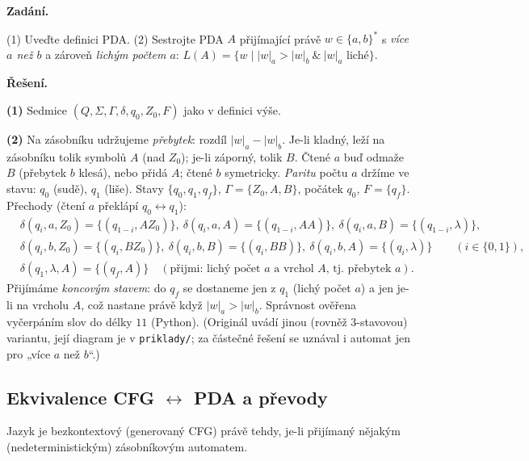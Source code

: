 \documentclass[11pt,a4paper]{article}
\begin{document}
\begin{priklad}
\par
\textbf{Zadání.}\par
(1) Uveďte definici PDA. (2) Sestrojte PDA $A$ přijímající právě $w\in\{a,b\}^*$ s \emph{více $a$ než $b$} a zároveň \emph{lichým počtem $a$}: $L(A)=\{w\mid |w|_a>|w|_b\ \&\ |w|_a$ liché$\}$.

\smallskip
\textbf{Řešení.}\par
\textbf{(1)} Sedmice $(Q,\Sigma,\Gamma,\delta,q_0,Z_0,F)$ jako v definici výše.

\textbf{(2)} Na zásobníku udržujeme \emph{přebytek}: rozdíl $|w|_a-|w|_b$. Je-li kladný, leží na zásobníku tolik symbolů $A$ (nad $Z_0$); je-li záporný, tolik $B$. Čtené $a$ buď odmaže $B$ (přebytek $b$ klesá), nebo přidá $A$; čtené $b$ symetricky. \emph{Paritu} počtu $a$ držíme ve stavu: $q_0$ (sudě), $q_1$ (liše). Stavy $\{q_0,q_1,q_f\}$, $\Gamma=\{Z_0,A,B\}$, počátek $q_0$, $F=\{q_f\}$. Přechody (čtení $a$ překlápí $q_0\!\leftrightarrow\! q_1$):
\[
\begin{aligned}
&\delta(q_i,a,Z_0)=\{(q_{1-i},AZ_0)\},\ \delta(q_i,a,A)=\{(q_{1-i},AA)\},\ \delta(q_i,a,B)=\{(q_{1-i},\lambda)\},\\
&\delta(q_i,b,Z_0)=\{(q_i,BZ_0)\},\ \delta(q_i,b,B)=\{(q_i,BB)\},\ \delta(q_i,b,A)=\{(q_i,\lambda)\}\qquad(i\in\{0,1\}),\\
&\delta(q_1,\lambda,A)=\{(q_f,A)\}\quad(\text{přijmi: lichý počet $a$ a vrchol $A$, tj.\ přebytek $a$}).
\end{aligned}
\]
Přijímáme \emph{koncovým stavem}: do $q_f$ se dostaneme jen z $q_1$ (lichý počet $a$) a jen je-li na vrcholu $A$, což nastane právě když $|w|_a>|w|_b$. Správnost ověřena vyčerpáním slov do délky $11$ (Python). (Originál uvádí jinou (rovněž 3-stavovou) variantu, její diagram je v \texttt{priklady/}; za částečné řešení se uznával i automat jen pro „více $a$ než $b$``.)
\end{priklad}

\subsection{Ekvivalence CFG \texorpdfstring{$\leftrightarrow$}{<->} PDA a převody}

\begin{veta}[CFG $=$ PDA]
Jazyk je bezkontextový (generovaný CFG) právě tehdy, je-li přijímaný nějakým (nedeterministickým) zásobníkovým automatem.
\end{veta}
\end{document}
